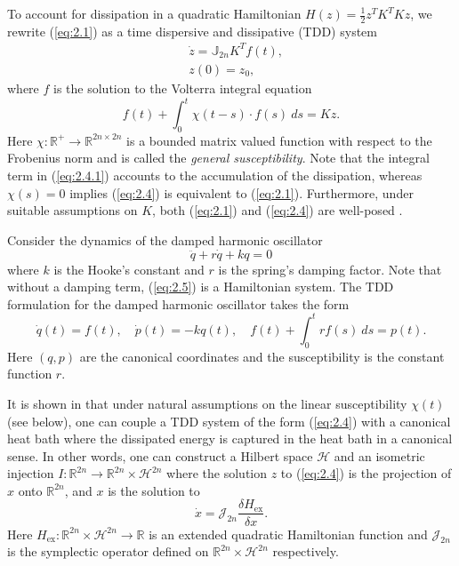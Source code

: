 To account for dissipation in a quadratic Hamiltonian $H(z) = \frac 1 2 z^T K^T K  z$, we rewrite (\ref{eq:2.1}) as a time dispersive and dissipative (TDD) \cite{Figotin:2006jy} system 
\begin{equation} \label{eq:2.4}
	\begin{aligned}
		& \dot {z} = \mathbb J_{2n} K^T f(t), \\
		& z(0) = z_0,
	\end{aligned}
\end{equation}
where $f$ is the solution to the Volterra integral equation \cite{corduneanu1991integral}
\begin{equation} \label{eq:2.4.1}
	f(t) + \int_0^t \chi(t-s) \cdot f(s)\ ds = K z.
\end{equation}
Here $\chi:\mathbb R^+\to \mathbb R^{2n\times 2n}$ is a bounded matrix valued function with respect to the Frobenius norm and is called the \emph{general susceptibility}. Note that the integral term in (\ref{eq:2.4.1}) accounts to the accumulation of the dissipation, whereas $\chi(s) = 0$ implies (\ref{eq:2.4}) is equivalent to (\ref{eq:2.1}). Furthermore, under suitable assumptions on $K$, both (\ref{eq:2.1}) and (\ref{eq:2.4}) are well-posed \cite{Figotin:2006jy}.

\begin{example} \label{example:2.1}
Consider the dynamics of the damped harmonic oscillator
\begin{equation} \label{eq:2.5}
	\ddot q + r \dot q + k q = 0
\end{equation}
where $k$ is the Hooke's constant and $r$ is the spring's damping factor. Note that without a damping term, (\ref{eq:2.5}) is a Hamiltonian system. The TDD formulation for the damped harmonic oscillator takes the form
\begin{equation} \label{eq:2.6}
	\dot q(t) = f(t), \quad \dot p(t) = - k q(t), \quad f(t) + \int_0^t r f(s) \ ds = p(t).
\end{equation}
Here $(q,p)$ are the canonical coordinates and the susceptibility is the constant function $r$.
\end{example}

It is shown in \cite{Figotin:2006jy,Figotin:2005} that under natural assumptions on the linear susceptibility $\chi(t)$ (see below), one can couple a TDD system of the form (\ref{eq:2.4}) with a canonical heat bath where the dissipated energy is captured in the heat bath in a canonical sense. In other words, one can construct a Hilbert space $\mathcal H$ and an isometric injection $I:\mathbb R^{2n} \to \mathbb R^{2n}\times \mathcal H^{2n}$ where the solution $z$ to (\ref{eq:2.4}) is the projection of $x$ onto $\mathbb R^{2n}$, and $x$ is the solution to
\begin{equation} \label{eq:2.7}
	\dot x = \mathcal J_{2n} \frac{\delta H_{\text{ex}}}{\delta x}.
\end{equation}
Here $H_{\text{ex}}:\mathbb R^{2n}\times \mathcal H^{2n} \to \mathbb R$ is an extended quadratic Hamiltonian function and $\mathcal J_{2n}$ is the symplectic operator defined on $\mathbb R^{2n}\times \mathcal H^{2n}$ respectively.

